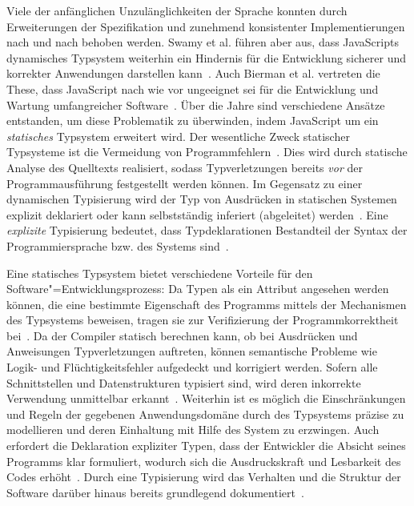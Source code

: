 Viele der anfänglichen Unzulänglichkeiten der Sprache konnten durch Erweiterungen der Spezifikation und zunehmend konsistenter Implementierungen nach und nach behoben werden. Swamy et al. führen aber aus, dass JavaScripts dynamisches Typsystem weiterhin ein Hindernis für die Entwicklung sicherer und korrekter Anwendungen darstellen kann~\autocite{NIKHIL:2014}. Auch Bierman et al. vertreten die These, dass JavaScript nach wie vor ungeeignet sei für die Entwicklung und Wartung umfangreicher Software~\autocite[1]{BIERMAN:2014}. Über die Jahre sind verschiedene Ansätze entstanden, um diese Problematik zu überwinden, indem JavaScript um ein \emph{statisches} Typsystem erweitert wird. Der wesentliche Zweck statischer Typsysteme ist die Vermeidung von Programmfehlern~\autocite[1]{CARDELLI:TYPE_SYSTEMS}. Dies wird durch statische Analyse des Quelltexts realisiert, sodass Typverletzungen bereits \emph{vor} der Programmausführung festgestellt werden können. Im Gegensatz zu einer dynamischen Typisierung wird der Typ von Ausdrücken in statischen Systemen explizit deklariert oder kann selbstständig inferiert (abgeleitet) werden~\autocite[45]{WALDMANN:PPS}. Eine \emph{explizite} Typisierung bedeutet, dass Typdeklarationen Bestandteil der Syntax der Programmiersprache bzw. des Systems sind~\autocite[2]{CARDELLI:TYPE_SYSTEMS}.

Eine statisches Typsystem bietet verschiedene Vorteile für den Software"=Entwicklungsprozess: Da Typen als ein Attribut angesehen werden können, die eine bestimmte Eigenschaft des Programms mittels der Mechanismen des Typsystems beweisen, tragen sie zur Verifizierung der Programmkorrektheit bei~\autocite{SMITH:TYPE_SYSTEMS}. Da der Compiler statisch berechnen kann, ob bei Ausdrücken und Anweisungen Typverletzungen auftreten, können semantische Probleme wie Logik- und Flüchtigkeitsfehler aufgedeckt und korrigiert werden. Sofern alle Schnittstellen und Datenstrukturen typisiert sind, wird deren inkorrekte Verwendung unmittelbar erkannt~\autocite[6]{CARDELLI:TYPE_SYSTEMS}. Weiterhin ist es möglich die Einschränkungen und Regeln der gegebenen Anwendungsdomäne durch des Typsystems präzise zu modellieren und deren Einhaltung mit Hilfe des System zu erzwingen. Auch erfordert die Deklaration expliziter Typen, dass der Entwickler die Absicht seines Programms klar formuliert, wodurch sich die Ausdruckskraft und Lesbarkeit des Codes erhöht~\autocite[96]{WALDMANN:PPS}. Durch eine Typisierung wird das Verhalten und die Struktur der Software darüber hinaus bereits grundlegend dokumentiert~\autocite[Abschn. 6.1.1]{MITCHELL:CONCEPTS}.

